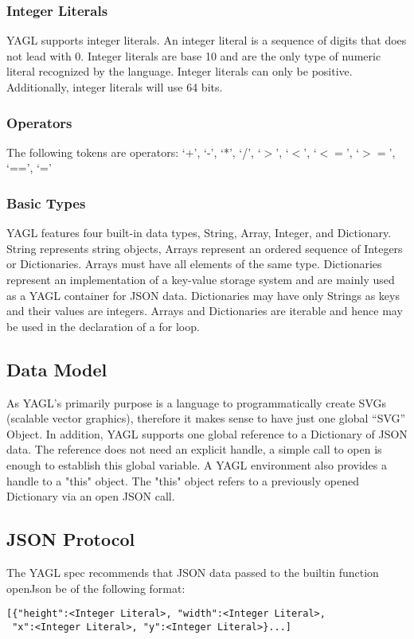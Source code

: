 \documentclass[12pt]{article}
\begin{document}
\subsubsection{Integer Literals}
YAGL supports integer literals.  An integer literal is a sequence of digits that does not lead with 0. Integer literals are base 10 and are the only type of numeric literal recognized by the language. Integer literals can only be positive.  Additionally, integer literals will use 64 bits.

\subsubsection{Operators}
The following tokens are operators:
‘+’, ‘-’, ‘*’, ‘/’, ‘$>$’, ‘$<$’, ‘$<=$’, ‘$>=$’, ‘==’, ‘=’

\subsubsection{Basic Types}
YAGL features four built-in data types, String, Array, Integer, and Dictionary. String represents string objects, Arrays represent an ordered sequence of Integers or Dictionaries. Arrays must have all elements of the same type.  Dictionaries represent an implementation of a key-value storage system and are mainly used as a YAGL container for JSON data. Dictionaries may have only Strings as keys and their values are integers. Arrays and Dictionaries are iterable and hence may be used in the declaration of a for loop. 

\subsection{Data Model}
As YAGL’s primarily purpose is a language to programmatically create SVGs (scalable vector graphics),
therefore it makes sense to have just one global “SVG” Object. In addition, YAGL supports one global reference to a Dictionary of JSON data. The reference does not need an explicit handle, a simple call to open is enough to establish this global variable. A YAGL environment also provides a handle to a "this" object. The "this" object refers to a previously opened Dictionary via an open JSON call.

\subsection{JSON Protocol}
The YAGL spec recommends that JSON data passed to the 
builtin function openJson be of the following format:
\begin{lstlisting}
[{"height":<Integer Literal>, "width":<Integer Literal>,
 "x":<Integer Literal>, "y":<Integer Literal>}...]
\end{lstlisting}
\end{document}
